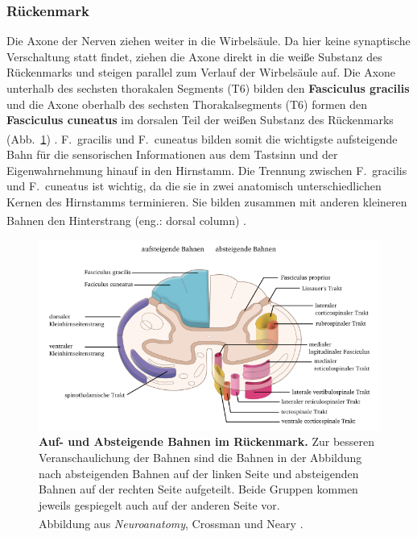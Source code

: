 \documentclass[12pt,a4paper,pdftex]{article}
\begin{document}
\subsubsection*{Rückenmark}
Die Axone der Nerven ziehen weiter in die Wirbelsäule. Da hier keine synaptische Verschaltung statt findet, ziehen die Axone direkt in die weiße Substanz des Rückenmarks und steigen parallel zum Verlauf der Wirbelsäule auf. Die Axone unterhalb des sechsten thorakalen Segments (T6) bilden den \textbf{Fasciculus gracilis}  und die Axone oberhalb des sechsten Thorakalsegments (T6) formen den \textbf{Fasciculus cuneatus}  im dorsalen Teil der weißen Substanz des Rückenmarks (Abb.~\ref{fig:bahnen_rueckenmark}) \textsuperscript{\cite[8]{paxinos2014rat}}. F.~gracilis und F.~cuneatus bilden somit die wichtigste aufsteigende Bahn für die sensorischen Informationen aus dem Tastsinn und der Eigenwahrnehmung hinauf in den Hirnstamm. 
Die Trennung zwischen F.~gracilis und F.~cuneatus ist wichtig, da die sie in zwei anatomisch unterschiedlichen Kernen des Hirnstamms terminieren. Sie bilden zusammen mit anderen kleineren Bahnen den Hinterstrang (eng.: dorsal column) \textsuperscript{\cite[22]{kandel2013principles}}. 

\begin{figure}[H]
    \centering
    \includegraphics [width = \textwidth]
    {pictures/somatosensory/aufabsteigendeBahnen_Rueckenmark.png}
    \caption[Auf- und Absteigende Bahnen im Rückenmark]{\textbf{Auf- und Absteigende Bahnen im Rückenmark.} Zur besseren Veranschaulichung der Bahnen sind die Bahnen in der Abbildung nach absteigenden Bahnen auf der linken Seite und absteigenden Bahnen auf der rechten Seite aufgeteilt. Beide Gruppen kommen jeweils gespiegelt auch auf der anderen Seite vor. \\
    Abbildung aus \textit{Neuroanatomy}, Crossman und Neary
    \textsuperscript{\cite[8]{crossman2014neuroanatomy}}.}
    \label{fig:bahnen_rueckenmark}
\end{figure}
\end{document}
